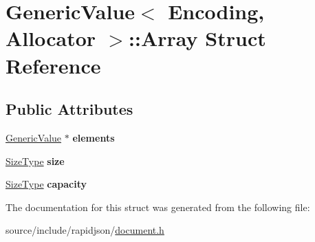\hypertarget{struct_generic_value_1_1_array}{}\section{Generic\+Value$<$ Encoding, Allocator $>$\+:\+:Array Struct Reference}
\label{struct_generic_value_1_1_array}
\subsection*{Public Attributes}
\begin{DoxyCompactItemize}
\item 
\hypertarget{struct_generic_value_1_1_array_a0af8e50f37486f042ab19fd871d11d4f}{}\hyperlink{class_generic_value}{Generic\+Value} $\ast$ {\bfseries elements}\label{struct_generic_value_1_1_array_a0af8e50f37486f042ab19fd871d11d4f}

\item 
\hypertarget{struct_generic_value_1_1_array_a60f69b3b57b86c20c123c1b080e34bcc}{}\hyperlink{rapidjson_8h_a5ed6e6e67250fadbd041127e6386dcb5}{Size\+Type} {\bfseries size}\label{struct_generic_value_1_1_array_a60f69b3b57b86c20c123c1b080e34bcc}

\item 
\hypertarget{struct_generic_value_1_1_array_a2f5dfb089ee750e9405d5adeda4df894}{}\hyperlink{rapidjson_8h_a5ed6e6e67250fadbd041127e6386dcb5}{Size\+Type} {\bfseries capacity}\label{struct_generic_value_1_1_array_a2f5dfb089ee750e9405d5adeda4df894}

\end{DoxyCompactItemize}


The documentation for this struct was generated from the following file\+:\begin{DoxyCompactItemize}
\item 
source/include/rapidjson/\hyperlink{document_8h}{document.\+h}\end{DoxyCompactItemize}
